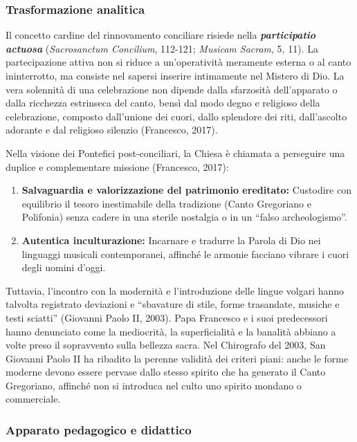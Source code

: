 \documentclass[12pt,a4paper]{article}
\begin{document}
	\subsubsection{Trasformazione analitica}\label{trasformazione-analitica-2}
	
	Il concetto cardine del rinnovamento conciliare risiede nella \textbf{\emph{participatio actuosa}} (\emph{Sacrosanctum Concilium}, 112-121; \emph{Musicam Sacram}, 5, 11). La partecipazione attiva non si riduce a un'operatività meramente esterna o al canto ininterrotto, ma consiste nel sapersi inserire intimamente nel Mistero di Dio. La vera solennità di una celebrazione non dipende dalla sfarzosità dell'apparato o dalla ricchezza estrinseca del canto, bensì dal modo degno e religioso della celebrazione, composto dall'unione dei cuori, dallo splendore dei riti, dall'ascolto adorante e dal religioso silenzio (Francesco, 2017).
	
	Nella visione dei Pontefici post-conciliari, la Chiesa è chiamata a perseguire una duplice e complementare missione (Francesco, 2017):
	
	\begin{enumerate}[label=\arabic*.,leftmargin=*]
		\item \textbf{Salvaguardia e valorizzazione del patrimonio ereditato:} Custodire con equilibrio il tesoro inestimabile della tradizione (Canto Gregoriano e Polifonia) senza cadere in una sterile nostalgia o in un ``falso archeologismo''.
		\item \textbf{Autentica inculturazione:} Incarnare e tradurre la Parola di Dio nei linguaggi musicali contemporanei, affinché le armonie facciano vibrare i cuori degli uomini d'oggi.
	\end{enumerate}
	
	Tuttavia, l'incontro con la modernità e l'introduzione delle lingue volgari hanno talvolta registrato deviazioni e ``sbavature di stile, forme trasandate, musiche e testi sciatti'' (Giovanni Paolo II, 2003). Papa Francesco e i suoi predecessori hanno denunciato come la mediocrità, la superficialità e la banalità abbiano a volte preso il sopravvento sulla bellezza sacra. Nel Chirografo del 2003, San Giovanni Paolo II ha ribadito la perenne validità dei criteri piani: anche le forme moderne devono essere pervase dallo stesso spirito che ha generato il Canto Gregoriano, affinché non si introduca nel culto uno spirito mondano o commerciale.
	
	\subsubsection{Apparato pedagogico e didattico}\label{apparato-pedagogico-e-didattico-2}
	
\end{document}
